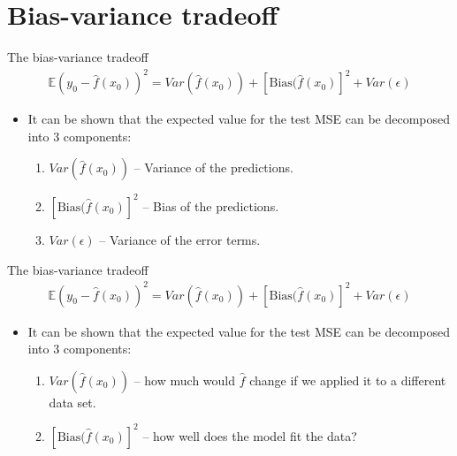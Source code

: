 \documentclass{beamer}
\begin{document}
\section*{Bias-variance tradeoff}

\begin{frame}{The bias-variance tradeoff}
\begin{align*}
	\mathbb{E} (y_{0} - \hat{f}(x_{0}))^{2} = Var(\hat{f}(x_{0})) + [\text{Bias}(\hat{f}(x_{0})]^{2} + Var(\epsilon)
\end{align*}
	\begin{itemize}
		\item It can be shown that the expected value for the test MSE can be decomposed into 3 components:
			\begin{enumerate}
				\item $Var(\hat{f}(x_{0}))$ -- Variance of the predictions.
				\item $ [\text{Bias}(\hat{f}(x_{0})]^{2}$ -- Bias of the predictions.
				\item $Var(\epsilon)$ -- Variance of the error terms.
			\end{enumerate}
	\end{itemize}
\end{frame}

\begin{frame}{The bias-variance tradeoff}
\begin{align*}
	\mathbb{E} (y_{0} - \hat{f}(x_{0}))^{2} = Var(\hat{f}(x_{0})) + [\text{Bias}(\hat{f}(x_{0})]^{2} + Var(\epsilon)
\end{align*}
	\begin{itemize}
		\item It can be shown that the expected value for the test MSE can be decomposed into 3 components:
			\begin{enumerate}
				\item $Var(\hat{f}(x_{0}))$ -- how much would $\hat{f}$ change if we applied it to a different data set.
				\item $ [\text{Bias}(\hat{f}(x_{0})]^{2}$ -- how well does the model fit the data?
			\end{enumerate}
	\end{itemize}
\end{frame}
\end{document}
